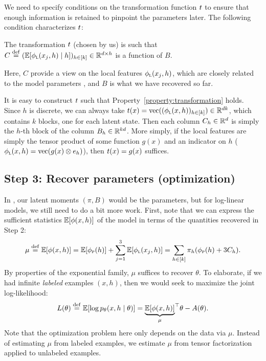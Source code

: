 We need to specify conditions on the transformation function $t$
to ensure that enough information is retained to pinpoint the parameters later.
The following condition characterizes $t$:
\begin{property}
  \label{property:transformation}
  The transformation $t$ (chosen by us) is such that $C \stackrel{\rm def}{=}
  (\mathbb{E}[\phi_\text{\sc l}(x_j, h) \mid h])_{h \in [k]} \in \mathbb{R}^{d \times h}$ is a
  function of $B$.
\end{property}
Here, $C$ provide a view on the local features $\phi_\text{\sc l}(x_j,h)$,
which are
closely related to the model parameters ,
and $B$ is what we have recovered so far.

It is easy to construct $t$ such that Property~\ref{property:transformation} holds.
Since $h$ is discrete,
we can always take $t(x) = \text{vec}((\phi_\text{\sc l}(x, h))_{h \in [k]}) \in \mathbb{R}^{dk}$,
which contains $k$ blocks, one for each latent state.
Then each column $C_h \in \mathbb{R}^d$ is simply the $h$-th block
of the column $B_h \in \mathbb{R}^{kd}$.
More simply, if
the local features are simply the tensor product of some function $g(x)$ and an
indicator on $h$ ($\phi_\text{\sc l}(x,h) = \text{vec}(g(x) \otimes e_h)$),
then $t(x) = g(x)$ suffices.

\subsection{Step 3: Recover parameters (optimization)}

In \cite{anandkumar12moments}, our latent moments $(\pi, B)$
would be the parameters, but for log-linear models,
we still need to do a bit more work.
First, note that we can express the sufficient statistics $\mathbb{E}[\phi(x,h)]$
of the model in terms of the quantities recovered in Step 2:
\begin{align}
  \mu \stackrel{\rm def}{=} \mathbb{E}[\phi(x,h)] = \mathbb{E}[\phi_\text{\sc p}(h)] + \sum_{j=1}^3 \mathbb{E}[\phi_\text{\sc l}(x_j,h)] = \sum_{h \in [k]} \pi_h (\phi_\text{\sc p}(h) + 3 C_h).
\end{align}
By properties of the exponential family, $\mu$ suffices to recover $\theta$.
To elaborate, if we had infinite \emph{labeled} examples $(x,h)$,
then we would seek to maximize the joint log-likelihood:
\begin{align}
L(\theta) \stackrel{\rm def}{=} \mathbb{E}[\log p_\theta(x, h \mid \theta)] = {\underbrace{\mathbb{E}[\phi(x,h)]}_{\mu}}^\top\theta - A(\theta).
\end{align}
Note that the optimization problem here only depends on the data via $\mu$.
Instead of estimating $\mu$ from labeled examples,
we estimate $\mu$ from tensor factorization applied to unlabeled examples.

